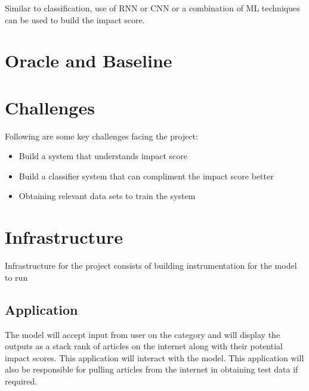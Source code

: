 \documentclass{article}
\begin{document}
Similar to classification, use of RNN or CNN or a combination of ML techniques can be used to build the impact score.

\section*{Oracle and Baseline} %




\section*{Challenges} %

Following are some key challenges facing the project:
\begin{itemize}
	\item Build a system that understands impact score
	\item Build a classifier system that can compliment the impact score better
	\item Obtaining relevant data sets to train the system
\end{itemize}

 

\section*{Infrastructure} %
Infrastructure for the project consists of building instrumentation for the model to run

\subsection*{Application}
The model will accept input from user on the category and will display the outputs as a stack rank of articles on the internet along with their potential impact scores. This application will interact with the model. This application will also be responsible for pulling articles from the internet in obtaining test data if required.
\end{document}
